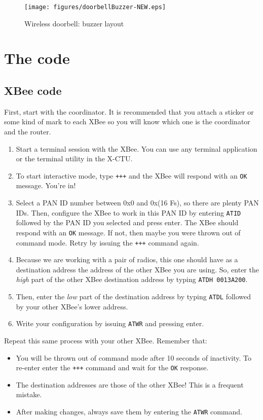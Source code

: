 \begin{figure}[htbp]
  \centering
  \texttt{[image: figures/doorbellBuzzer-NEW.eps]}
  \caption{Wireless doorbell: buzzer layout
  \label{fig:wirelessDoorbellBuzzer}}
\end{figure}

\section{The code}\label{wirelessDoorbellCode}
\subsection{XBee code}

First, start with the coordinator. It is recommended that you attach a sticker or some kind of mark to each XBee so you will know which one is the coordinator and the router.
\begin{enumerate}
  \item Start a terminal session with the XBee. You can use any terminal application or the terminal utility in the X-CTU.
  \item To start interactive mode, type \texttt{+++} and the XBee will respond with an \texttt{OK} message. You're in!
  \item Select a PAN ID number between 0x0 and 0x(16 Fs), so there are plenty PAN IDs. Then, configure the XBee to work in this PAN ID by entering \texttt{ATID} followed by the PAN ID you selected and press enter. The XBee should respond with an \texttt{OK} message. If not, then maybe you were thrown out of command mode. Retry by issuing the \texttt{+++} command again.
  \item Because we are working with a pair of radios, this one should have as a destination address the address of the other XBee you are using. So, enter the \emph{high} part of the other XBee destination address by typing \texttt{ATDH 0013A200}.
  \item Then, enter the \emph{low} part of the destination address by typing \texttt{ATDL} followed by your other XBee's lower address.
  \item Write your configuration by issuing \texttt{ATWR} and pressing enter.
\end{enumerate}

Repeat this same process with your other XBee. Remember that:

\begin{itemize}
  \item You will be thrown out of command mode after 10 seconds of inactivity. To re-enter enter the \texttt{+++} command and wait for the \texttt{OK} response.
  \item The destination addresses are those of the other XBee! This is a frequent mistake.
  \item After making changes, always save them by entering the \texttt{ATWR} command.
\end{itemize}

